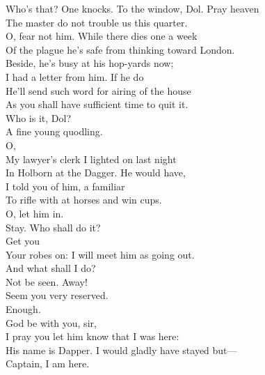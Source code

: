 \documentclass[a4paper,oneside,12pt]{memoir}
\begin{document}
\begin{drama*}
\subtlespeaks Who's that? One knocks. To the window, Dol. Pray heaven\\
The master do not trouble us this quarter.\\
\facespeaks  O, fear not him. While there dies one a week\\
Of the plague he's safe from thinking toward London.\\
Beside, he's busy at his hop-yards now;\\
I had a letter from him. If he do\\
He'll send such word for airing of the house\\
As you shall have sufficient time to quit it.\\
\subtlespeaks Who is it, Dol?\\
\dolspeaks {} A fine young quodling.\\
\facespeaks {} O,\\
My lawyer's clerk I lighted on last night\\
In Holborn at the Dagger. He would have,\\
I told you of him, a familiar\\
To rifle with at horses and win cups.\\
\dolspeaks O, let him in.\\
\subtlespeaks {} Stay. Who shall do it?\\
\facespeaks {}  Get you\\
Your robes on: I will meet him as going out.\\
\dolspeaks And what shall I do?\\
\facespeaks {} Not be seen. Away!\\
Seem you very reserved.\\
\subtlespeaks {} Enough.\\
\facespeaks {}  God be with you, sir,\\
I pray you let him know that I was here:\\
His name is Dapper. I would gladly have stayed but---\\
\dapperspeaks {} Captain, I am here.\\

\end{drama*}
\end{document}
